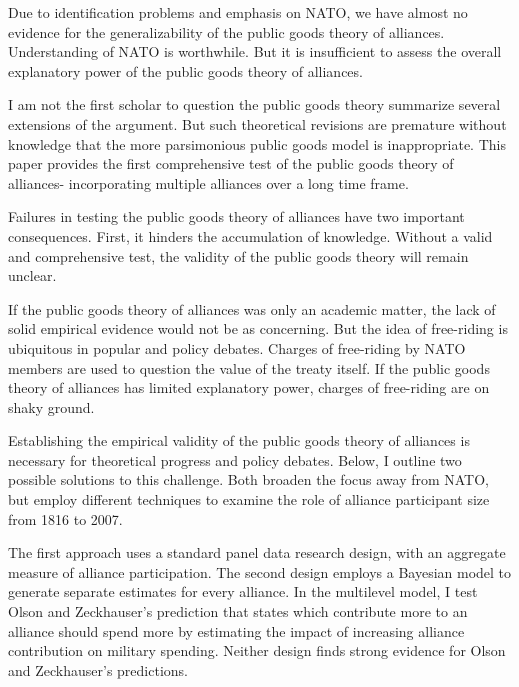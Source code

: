 \documentclass[12pt]{article}
\begin{document}
Due to identification problems and emphasis on NATO, we have almost no evidence for the generalizability of the public goods theory of alliances. 
Understanding of NATO is worthwhile. 
But it is insufficient to assess the overall explanatory power of the public goods theory of alliances. 


I am not the first scholar to question the public goods theory 
\citep{SandlerHartley2001} summarize several extensions of the argument.  
But such theoretical revisions are premature without knowledge that the more parsimonious public goods model is inappropriate. 
This paper provides the first comprehensive test of the public goods theory of alliances- incorporating multiple alliances over a long time frame. 


Failures in testing the public goods theory of alliances have two important consequences. 
First, it hinders the accumulation of knowledge. 
Without a valid and comprehensive test, the validity of the public goods theory will remain unclear. 


If the public goods theory of alliances was only an academic matter, the lack of solid empirical evidence would not be as concerning. 
But the idea of free-riding is ubiquitous in popular and policy debates. 
Charges of free-riding by NATO members are used to question the value of the treaty itself. 
If the public goods theory of alliances has limited explanatory power, charges of free-riding are on shaky ground. 


Establishing the empirical validity of the public goods theory of alliances is necessary for theoretical progress and policy debates. 
Below, I outline two possible solutions to this challenge. 
Both broaden the focus away from NATO, but employ different techniques to examine the role of alliance participant size from 1816 to 2007. 


The first approach uses a standard panel data research design, with an aggregate measure of alliance participation. 
The second design employs a Bayesian model to generate separate estimates for every alliance. 
In the multilevel model, I test Olson and Zeckhauser's prediction that states which contribute more to an alliance should spend more by estimating the impact of increasing alliance contribution on military spending. 
Neither design finds strong evidence for Olson and Zeckhauser's predictions. 
\end{document}
